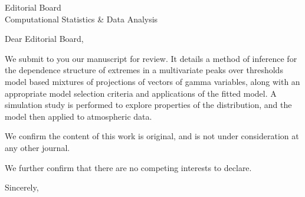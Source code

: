 \documentclass[letterpaper,11pt]{letter}
\begin{document}
%

\begin{letter}{Editorial Board \\ Computational Statistics \& Data Analysis}

\opening{Dear Editorial Board,}

We submit to you our manuscript for review.  It details a method of inference for the dependence structure of
extremes in a multivariate peaks over thresholds model based mixtures of projections of vectors of gamma variables, 
along with an appropriate model selection criteria and applications of the fitted model.  A simulation study 
is performed to explore properties of the distribution, and the model then applied to atmospheric data.

We confirm the content of this work is original, and is not under consideration at any other journal.

We further confirm that there are no competing interests to declare.

Sincerely,

\closing{~}

\end{letter}
\end{document}
